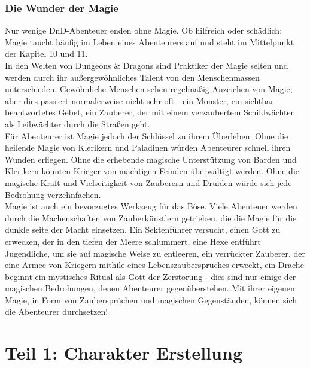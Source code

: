 \subsection{Die Wunder der Magie}
Nur wenige DnD-Abenteuer enden ohne Magie. Ob hilfreich oder schädlich: Magie taucht häufig im Leben eines Abenteurers auf und steht im Mittelpunkt der Kapitel 10 und 11.\\
In den Welten von Dungeons & Dragons sind Praktiker der Magie selten und werden durch ihr außergewöhnliches Talent von den Menschenmassen unterschieden. Gewöhnliche Menschen sehen regelmäßig Anzeichen von Magie, aber dies passiert normalerweise nicht sehr oft - ein Monster, ein sichtbar beantwortetes Gebet, ein Zauberer, der mit einem verzaubertem Schildwächter als Leibwächter durch die Straßen geht.\\
Für Abenteurer ist Magie jedoch der Schlüssel zu ihrem Überleben. Ohne die heilende Magie von Klerikern und Paladinen würden Abenteurer schnell ihren Wunden erliegen. Ohne die erhebende magische Unterstützung von Barden und Klerikern könnten Krieger von mächtigen Feinden überwältigt werden. Ohne die magische Kraft und Vielseitigkeit von Zauberern und Druiden würde sich jede Bedrohung verzehnfachen.\\
Magie ist auch ein bevorzugtes Werkzeug für das Böse. Viele Abenteuer werden durch die Machenschaften von Zauberkünstlern getrieben, die die Magie für die dunkle seite der Macht einsetzen. Ein Sektenführer versucht, einen Gott zu erwecken, der in den tiefen der Meere schlummert, eine Hexe entführt Jugendliche, um sie auf magische Weise zu entleeren, ein verrückter Zauberer, der eine Armee von Kriegern mithile eines Lebenszauberspruches erweckt, ein Drache beginnt ein mystisches Ritual als Gott der Zerstörung - dies sind nur einige der magischen Bedrohungen, denen Abenteurer gegenüberstehen. Mit ihrer eigenen Magie, in Form von Zaubersprüchen und magischen Gegenständen, können sich die Abenteurer durchsetzen!

\chapter{Teil 1: Charakter Erstellung}

